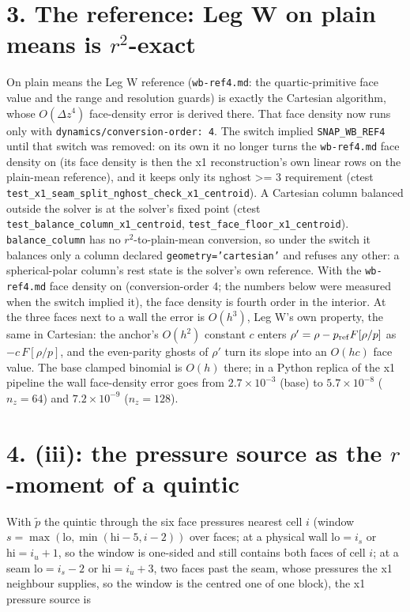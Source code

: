 \documentclass[11pt,a4paper]{article}
\begin{document}
\section*{3. The reference: Leg W on plain means is $r^2$-exact}

On plain means the Leg W reference (\texttt{wb-ref4.md}: the quartic-primitive face
value and the range and resolution guards) is exactly the
Cartesian algorithm, whose $O(\Delta z^4)$ face-density error is derived there. That face density now runs only
with \texttt{dynamics/conversion-order: 4}. The switch implied \texttt{SNAP\_WB\_REF4} until that switch was removed: on its own
it no longer turns the \texttt{wb-ref4.md} face density on (its face density is then the x1 reconstruction's own
linear rows on the plain-mean reference), and it keeps only its nghost >= 3 requirement (ctest
\texttt{test\_x1\_seam\_split\_nghost\_check\_x1\_centroid}). A Cartesian column
balanced outside the solver is at the solver's fixed point (ctest \texttt{test\_balance\_column\_x1\_centroid},
\texttt{test\_face\_floor\_x1\_centroid}).
\texttt{balance\_column} has no $r^2$-to-plain-mean conversion, so under the switch it balances only a column declared
\texttt{geometry='cartesian'} and refuses any other: a spherical-polar column's rest state is the solver's own reference. With the \texttt{wb-ref4.md}
face density on (conversion-order 4; the numbers below were measured when the switch implied it), the face
density is fourth order in the interior. At the three faces
next to a wall the error is $O(h^3)$, Leg W's own property, the same in Cartesian: the anchor's $O(h^2)$
constant $c$ enters $\rho' = \rho - p_{\rm ref} F[\rho/p]$ as $-c\,F[\rho/p]$, and the even-parity ghosts of
$\rho'$ turn its slope into an $O(h c)$ face value. The base clamped binomial is $O(h)$ there; in a Python replica of the x1
pipeline the wall face-density error goes from $2.7\times10^{-3}$ (base) to
$5.7\times10^{-8}$ ($n_z = 64$) and $7.2\times10^{-9}$ ($n_z = 128$).

\section*{4. (iii): the pressure source as the $r$-moment of a quintic}

With $\tilde p$ the quintic through the six face pressures nearest cell $i$ (window
$s = \max(\mathrm{lo}, \min(\mathrm{hi} - 5, i - 2))$ over faces; at a physical wall $\mathrm{lo} = i_s$ or
$\mathrm{hi} = i_u + 1$, so the window is one-sided and still contains both faces of cell $i$; at a seam
$\mathrm{lo} = i_s - 2$ or $\mathrm{hi} = i_u + 3$, two faces past the seam, whose pressures the x1 neighbour
supplies, so the window is the centred one of one block), the x1 pressure source is
\end{document}
